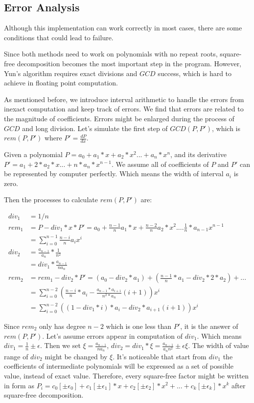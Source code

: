 \subsection{Error Analysis}

Although this implementation can work correctly in most cases, there are some
conditions that could lead to failure.

Since both methods need to work on polynomials with no repeat roots, square-free
decomposition becomes the most important step in the program. However, Yun's
algorithm requires exact divisions and $GCD$ success, which is hard to achieve
in floating point computation.

As mentioned before, we introduce interval arithmetic to handle the errors from
inexact computation and keep track of errors. We find that errors are related to
the magnitude of coefficients. Errors might be enlarged during the process of
$GCD$ and long division. Let's simulate the first step of $GCD(P,P')$, which is
$rem(P,P')$ where $P' = \frac{dP}{dx}$.

Given a polynomial $P=a_0+a_1*x + a_2*x^2...+a_n*x^n$, and its derivative
$P'=a_1+2*a_2*x...+n*a_n*x^{n-1}$. We assume all of coefficients of $P$ and $P'$
can be represented by computer perfectly. Which means the width of interval
$a_i$ is zero.

Then the processes to calculate $rem(P,P')$ are:

\begin{align*}
  div_1 &= 1/n \\ 
  rem_1 &= P - div_1 * x * P' =  a_0 + \frac{n-1}{n}a_1*x+ \frac{n-2}{n}a_2*x^2....
\frac{1}{n}*a_{n-1}x^{n-1}\\ 
       &= \sum_{i=0}^{n-1} \frac{n-i}{n} a_i x^i \\
  div_2 &= \frac{a_{n-1}}{a_n} * \frac{1}{n^2} \\ 
       &= div_1 * \frac{a_{n-1}}{na_n}\\
  rem_2 &= rem_1 - div_2 * P' = (a_0 - div_2*a_1) + (\frac{n-1}{n}*a_1 - div_2 *
  2*a_2)+ ... \\
      &= \sum_{i=0}^{n-2} (\frac{n-i}{n}*a_i -
      \frac{a_{n-1}*a_{i+1}}{n^2*a_n}(i+1)) x^i \\
      &= \sum_{i=0}^{n-2} ((1-div_1*i)*a_i -
       div_2 * a_{i+1}(i+1)) x^i
\end{align*} 

Since $rem_2$ only has degree $n-2$ which is one less than $P'$, it is the
answer of $rem(P,P')$. Let's assume errors appear in computation of $div_1$.
Which means $div_1 = \frac{1}{n}\pm \epsilon$. Then we set $\xi =
\frac{a_{n-1}}{na_n}$, $div_2 = div_1 * \xi = \frac{a_{n-1}}{a_nn^2}  \pm
\epsilon \xi$. The width of value range of $div_2$ might be changed by $\xi$.
It's noticeable that start from $div_1$ the coefficients of intermediate
polynomials will be expressed as a set of possible value, instead of exact
value. Therefore, every square-free factor might be written in form as $P_i =
c_0[\pm \epsilon_0]+ c_1[\pm \epsilon_1]*x + c_2[\pm \epsilon_2]*x^2+ ... +
c_k[\pm \epsilon_k]*x^k$ after square-free decomposition.

